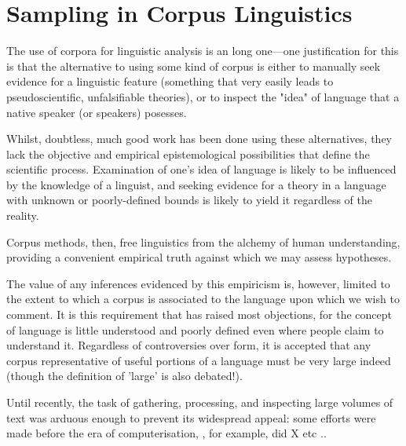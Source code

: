 


\section{Sampling in Corpus Linguistics}
\label{sec:sampling-corpus-linguistics}

The use of corpora for linguistic analysis is an long one---one justification for this is that the alternative to using some kind of corpus is either to manually seek evidence for a linguistic feature (something that very easily leads to pseudoscientific, unfalsifiable theories), or to inspect the "idea" of language that a native speaker (or speakers) posesses.

Whilst, doubtless, much good work has been done using these alternatives, they lack the objective and empirical epistemological possibilities that define the scientific process.  Examination of one's idea of language is likely to be influenced by the knowledge of a linguist, and seeking evidence for a theory in a language with unknown or poorly-defined bounds is likely to yield it regardless of the reality. %

Corpus methods, then, free linguistics from the alchemy of human understanding, providing a convenient empirical truth against which we may assess hypotheses.

The value of any inferences evidenced by this empiricism is, however, limited to the extent to which a corpus is associated to the language upon which we wish to comment.  It is this requirement that has raised most objections, for the concept of language is little understood and poorly defined even where people claim to understand it.  Regardless of controversies over form, it is accepted that any corpus representative of useful portions of a language must be very large indeed (though the definition of 'large' is also debated!).

Until recently, the task of gathering, processing, and inspecting large volumes of text was arduous enough to prevent its widespread appeal: some efforts were made before the era of computerisation, %
, for example, did X etc ..%

